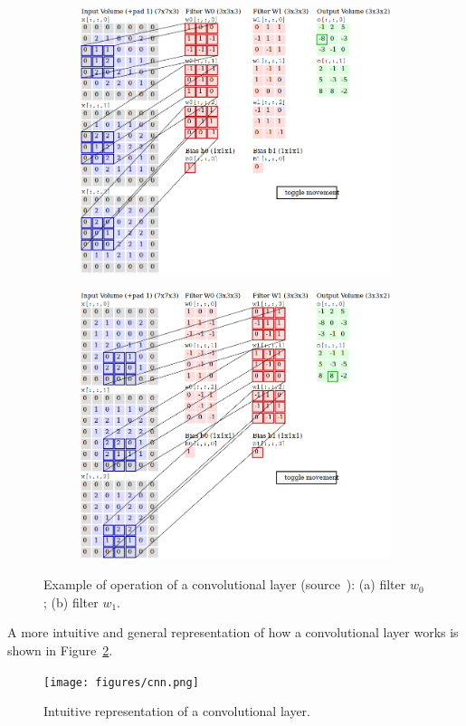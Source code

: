 \begin{description}
	\begin{figure}
		\centering
		\begin{subfigure}{0.7\textwidth}
			\centering
			\includegraphics[width=1\linewidth]{figures/convlayer_anime1big.png}
			\caption{}
		\end{subfigure}
		\begin{subfigure}{0.7\textwidth}
			\centering
			\includegraphics[width=1\linewidth]{figures/convlayer_anime2big.png}
			\caption{}
		\end{subfigure}
		\caption{Example of operation of a convolutional layer (source~\cite{cs231n}): (a) filter $w_0$; (b) filter $w_1$.}
		\label{fig:convlayer}
	\end{figure}
	
	A more intuitive and general representation of how a convolutional layer works is shown in Figure~\ref{fig:convlayersimple}.
	\begin{figure}
		\centering
		\texttt{[image: figures/cnn.png]}
		\caption{Intuitive representation of a convolutional layer.}
		\label{fig:convlayersimple}
	\end{figure}	
\end{description}

